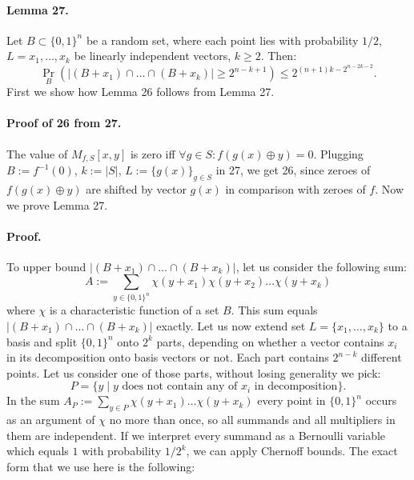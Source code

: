 \paragraph{Lemma 27.} Let $B\subset\{0,1\}^n$ be a random set, where each point lies with probability $1/2$, $L=x_1,\ldots,x_k$ be linearly independent vectors, $k\geq2$. Then:
\[\Pr_B(|(B+x_1)\cap\ldots\cap(B+x_k)|\geq2^{n-k+1})\leq2^{(n+1)k-2^{n-2k-2}}.\]
First we show how Lemma 26 follows from Lemma 27.
\paragraph{Proof of 26 from 27.} The value of $M_{f,S}[x,y]$ is zero iff $\forall g\in S:f(g(x)\oplus y)=0$. Plugging $B:=f^{-1}(0)$, $k:=|S|$, $L:=\{g(x)\}_{g\in S}$ in 27, we get 26, since zeroes of $f(g(x)\oplus y)$ are shifted by vector $g(x)$ in comparison with zeroes of $f$.
Now we prove Lemma 27.
\paragraph{Proof.} To upper bound $|(B+x_1)\cap\ldots\cap(B+x_k)|$, let us consider the following sum:
\[A:=\sum_{y\in\{0,1\}^n}\chi(y+x_1)\chi(y+x_2)\ldots\chi(y+x_k)\]
where $\chi$ is a characteristic function of a set $B$. This sum equals $|(B+x_1)\cap\ldots\cap(B+x_k)|$ exactly.
Let us now extend set $L=\{x_1,\ldots,x_k\}$ to a basis and split $\{0,1\}^n$ onto $2^k$ parts, depending on whether a vector contains $x_i$ in its decomposition onto basis vectors or not. Each part contains $2^{n-k}$ different points. Let us consider one of those parts, without losing generality we pick:
\[P=\{y\mid y\text{ does not contain any of }x_i\text{ in decomposition}\}.\]
In the sum $A_P:=\sum_{y\in P}\chi(y+x_1)\ldots\chi(y+x_k)$ every point in $\{0,1\}^n$ occurs as an argument of $\chi$ no more than once, so all summands and all multipliers in them are independent.
If we interpret every summand as a Bernoulli variable which equals $1$ with probability $1/2^k$, we can apply Chernoff bounds.
The exact form that we use here is the following:
